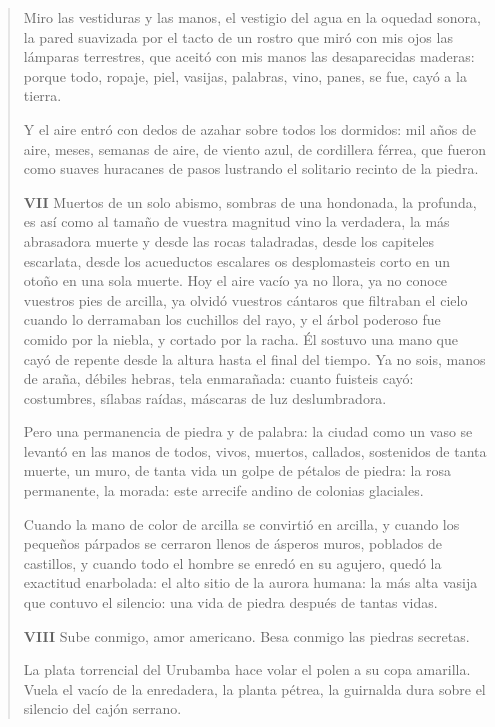 \documentclass[12pt]{article}
\begin{document}
\begin{verse}
Miro las vestiduras y las manos,  
el vestigio del agua en la oquedad sonora,  
la pared suavizada por el tacto de un rostro  
que miró con mis ojos las lámparas terrestres,  
que aceitó con mis manos las desaparecidas  
maderas: porque todo, ropaje, piel, vasijas,  
palabras, vino, panes,  
se fue, cayó a la tierra.  
	
Y el aire entró con dedos  
de azahar sobre todos los dormidos:  
mil años de aire, meses, semanas de aire,  
de viento azul, de cordillera férrea,  
que fueron como suaves huracanes de pasos  
lustrando el solitario recinto de la piedra.  

\textbf{ VII}
Muertos de un solo abismo, sombras de una hondonada,  
la profunda, es así como al tamaño  
de vuestra magnitud  
vino la verdadera, la más abrasadora  
muerte y desde las rocas taladradas,  
desde los capiteles escarlata,  
desde los acueductos escalares  
os desplomasteis corto en un otoño  
en una sola muerte.  
Hoy el aire vacío ya no llora,  
ya no conoce vuestros pies de arcilla,  
ya olvidó vuestros cántaros que filtraban el cielo  
cuando lo derramaban los cuchillos del rayo,  
y el árbol poderoso fue comido  
por la niebla, y cortado por la racha.  
Él sostuvo una mano que cayó de repente  
desde la altura hasta el final del tiempo.  
Ya no sois, manos de araña, débiles  
hebras, tela enmarañada:  
cuanto fuisteis cayó: costumbres, sílabas  
raídas, máscaras de luz deslumbradora.  
	
Pero una permanencia de piedra y de palabra:  
la ciudad como un vaso se levantó en las manos  
de todos, vivos, muertos, callados, sostenidos  
de tanta muerte, un muro, de tanta vida un golpe  
de pétalos de piedra: la rosa permanente, la morada:  
este arrecife andino de colonias glaciales.  
	
Cuando la mano de color de arcilla  
se convirtió en arcilla, y cuando los pequeños párpados se cerraron  
llenos de ásperos muros, poblados de castillos,  
y cuando todo el hombre se enredó en su agujero,  
quedó la exactitud enarbolada:  
el alto sitio de la aurora humana:  
la más alta vasija que contuvo el silencio:  
una vida de piedra después de tantas vidas.  

\textbf{ VIII}
Sube conmigo, amor americano.  
Besa conmigo las piedras secretas.  
	
La plata torrencial del Urubamba  
hace volar el polen a su copa amarilla.  
Vuela el vacío de la enredadera,  
la planta pétrea, la guirnalda dura  
sobre el silencio del cajón serrano.  
	

\end{verse}
\end{document}

